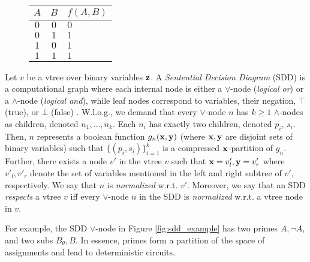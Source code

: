 \begin{figure*}[h!]
    \begin{subfigure}[t]{0.6\textwidth}
        \centering
        
    \end{subfigure}
    ~
    \begin{subfigure}[t]{0.4\textwidth}
        \vspace{-3.2cm}
        \begin{tabular}{cc|l}
           $A$ & $B$ & $f(A, B)$ \\
           \hline
           $0$ & $0$ & $0$ \\
           $0$ & $1$ & $1$ \\
           $1$ & $0$ & $1$ \\
           $1$ & $1$ & $1$
        \end{tabular}
    \end{subfigure}
    \caption{An SDD representing $f(A, B) = (A \land \top) \lor (\neg A \land B) = A \lor B$. Note that we cannot directly attach $A$ and $B$ to an \textit{or} node since this would violate the smoothness property of the circuit.}
    \label{fig:sdd_example}
\end{figure*}

\begin{definition}[SDD]
    Let $v$ be a vtree over binary variables $\mathbf{z}$.
    A \emph{Sentential Decision Diagram} (SDD) is a computational graph where each internal node is either a $\lor$-node (\emph{logical or}) or a $\land$-node (\emph{logical and}), while leaf nodes correspond to variables, their negation, $\top$ (true), or $\bot$ (false) \cite{sdd}. W.l.o.g., we demand that every $\lor$-node $n$ has $k \geq 1$ $\land$-nodes as children, denoted $n_1,\dots,n_k$. Each $n_i$ has exactly two children, denoted $p_i$, $s_i$. Then, $n$ represents a boolean function $g_n(\mathbf{x}, \mathbf{y})$ (where $\mathbf{x}, \mathbf{y}$ are disjoint sets of binary variables) such that $\{(p_i,s_i)\}_{i=1}^k$ is a compressed $\mathbf{x}$-partition of $g_n$. Further, there exists a node $v'$ in the vtree $v$ such that $\mathbf{x} = v'_l, \mathbf{y} = v'_r$ where $v'_l, v'_r$ denote the set of variables mentioned in the left and right subtree of $v'$, respectively. We say that $n$ is \emph{normalized} w.r.t. $v'$.
    Moreover, we say that an SDD \emph{respects} a vtree $v$ iff every $\lor$-node $n$ in the SDD is \emph{normalized} w.r.t. a vtree node in $v$.
\end{definition}

For example, the SDD $\lor$-node in Figure \ref{fig:sdd_example} has two primes $A, \neg A$, and two subs $B_\theta, B$. In essence, primes form a partition of the space of assignments and lead to deterministic circuits.


